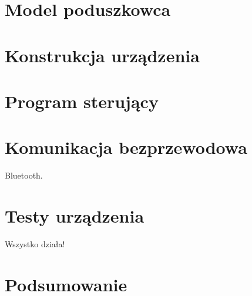 \documentclass[a4paper, 12pt, twoside, openright]{report}
\begin{document}
\chapter{Model poduszkowca}

\chapter{Konstrukcja urządzenia}

\chapter{Program sterujący}

\chapter{Komunikacja bezprzewodowa}
Bluetooth.
\chapter{Testy urządzenia}
Wszystko działa!
\chapter*{Podsumowanie}


\listoffigures
\listoftables



\end{document}
